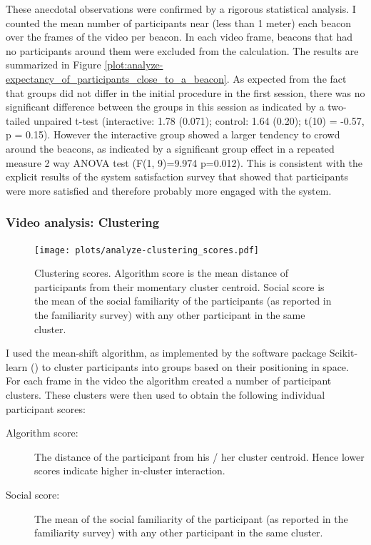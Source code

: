 \documentclass[a4paper,11pt]{article}
\begin{document}
{These anecdotal observations were confirmed by a rigorous statistical analysis.
I counted the mean number of participants near (less than 1 meter) each beacon over the frames of the video per beacon.
In each video frame, beacons that had no participants around them were excluded from the calculation.
The results are summarized in Figure \ref{plot:analyze-expectancy_of_participants_close_to_a_beacon}.
As expected from the fact that groups did not differ in the initial procedure in the first session, there was no significant difference between the groups in this session as indicated by a two-tailed unpaired t-test (interactive: 1.78 (0.071); control: 1.64 (0.20); t(10) = -0.57, p = 0.15).
However the interactive group showed a larger tendency to crowd around the beacons, as indicated by a significant group effect in a repeated measure 2 way ANOVA test (F(1, 9)=9.974 p=0.012).
This is consistent with the explicit results of the system satisfaction survey that showed that participants were more satisfied and therefore probably more engaged with the system.

\subsubsection{Video analysis: Clustering}\label{results:clustering}

\begin{figure}[!htb]
    \centering
    \texttt{[image: plots/analyze-clustering\_scores.pdf]}
    \caption{Clustering scores. Algorithm score is the mean distance of participants from their momentary cluster centroid. Social score is the mean of the social familiarity of the participants (as reported in the familiarity survey) with any other participant in the same cluster.}\label{plot:analyze-clustering_scores}
\end{figure}

I used the mean-shift algorithm, as implemented by the software package Scikit-learn (\cite{scikit-learn}) to cluster participants into groups based on their positioning in space.
For each frame in the video the algorithm created a number of participant clusters.
These clusters were then used to obtain the following individual participant scores:

\begin{description}
    \item[Algorithm score:] The distance of the participant from his / her cluster centroid.
        Hence lower scores indicate higher in-cluster interaction. \label{results:algorithm_score}
    \item[Social score:] The mean of the social familiarity of the participant (as reported in the familiarity survey) with any other participant in the same cluster. \label{results:social_score}
\end{description}

}
\end{document}
